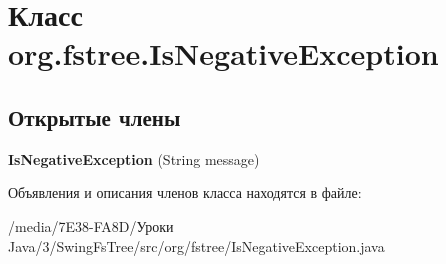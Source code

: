 \hypertarget{classorg_1_1fstree_1_1_is_negative_exception}{
\section{Класс org.fstree.IsNegativeException}
\label{classorg_1_1fstree_1_1_is_negative_exception}
}
\subsection*{Открытые члены}
\begin{DoxyCompactItemize}
\item 
\hypertarget{classorg_1_1fstree_1_1_is_negative_exception_a1f0d46ed656d17c5a45f9d0c1b1df564}{
{\bfseries IsNegativeException} (String message)}
\label{classorg_1_1fstree_1_1_is_negative_exception_a1f0d46ed656d17c5a45f9d0c1b1df564}

\end{DoxyCompactItemize}


Объявления и описания членов класса находятся в файле:\begin{DoxyCompactItemize}
\item 
/media/7E38-\/FA8D/Уроки Java/3/SwingFsTree/src/org/fstree/IsNegativeException.java\end{DoxyCompactItemize}
